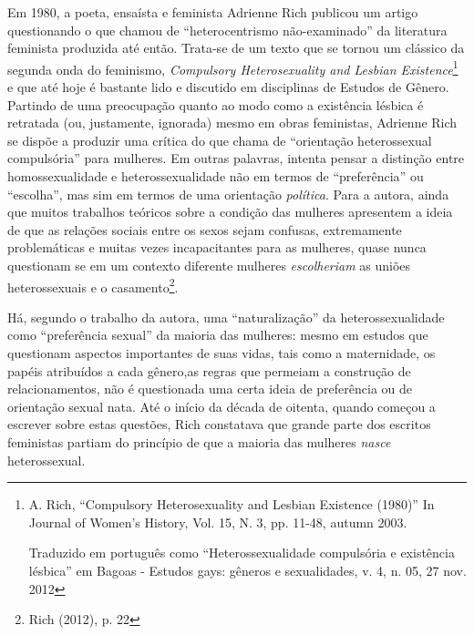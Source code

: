 Em 1980, a poeta, ensaísta e feminista Adrienne Rich publicou um artigo
questionando o que chamou de ``heterocentrismo não-examinado'' da
literatura feminista produzida até então. Trata-se de um texto que se
tornou um clássico da segunda onda do feminismo, \emph{Compulsory
Heterosexuality and Lesbian Existence}\footnote{A. Rich, ``Compulsory
  Heterosexuality and Lesbian Existence (1980)'' In Journal of Women's
  History, Vol. 15, N. 3, pp. 11-48, autumn 2003.

  Traduzido em português como ``Heterossexualidade compulsória e
  existência lésbica'' em Bagoas - Estudos gays: gêneros e sexualidades,
  v. 4, n. 05, 27 nov. 2012} e que até hoje é bastante lido e discutido
em disciplinas de Estudos de Gênero. Partindo de uma preocupação quanto
ao modo como a existência lésbica é retratada (ou, justamente, ignorada)
mesmo em obras feministas, Adrienne Rich se dispõe a produzir uma
crítica do que chama de ``orientação heterossexual compulsória'' para
mulheres. Em outras palavras, intenta pensar a distinção entre
homossexualidade e heterossexualidade não em termos de ``preferência''
ou ``escolha'', mas sim em termos de uma orientação \emph{política}.
Para a autora, ainda que muitos trabalhos teóricos sobre a condição das
mulheres apresentem a ideia de que as relações sociais entre os sexos
sejam confusas, extremamente problemáticas e muitas vezes incapacitantes
para as mulheres, quase nunca questionam se em um contexto diferente
mulheres \emph{escolheriam} as uniões heterossexuais e o
casamento\footnote{Rich (2012), p. 22}.

Há, segundo o trabalho da autora, uma ``naturalização'' da
heterossexualidade como ``preferência sexual'' da maioria das mulheres:
mesmo em estudos que questionam aspectos importantes de suas vidas, tais
como a maternidade, os papéis atribuídos a cada gênero,as regras que
permeiam a construção de relacionamentos, não é questionada uma certa
ideia de preferência ou de orientação sexual nata. Até o início da
década de oitenta, quando começou a escrever sobre estas questões, Rich
constatava que grande parte dos escritos feministas partiam do princípio
de que a maioria das mulheres \emph{nasce} heterossexual.


